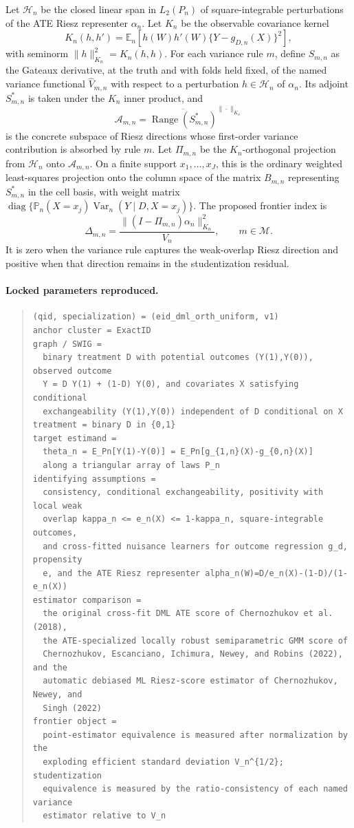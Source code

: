 \documentclass[11pt]{article}
\newcommand{\E}{\mathbb{E}}
\renewcommand{\Pr}{\mathbb{P}}
\newcommand{\calH}{\mathcal{H}}
\theoremstyle{definition}
\theoremstyle{plain}
\theoremstyle{remark}
\begin{document}
Let \(\calH_n\) be the closed linear span in \(L_2(P_n)\) of square-integrable perturbations of the ATE Riesz representer \(\alpha_n\).  Let \(K_n\) be the observable covariance kernel
\[
  K_n(h,h')=
  \E_n\!\left[h(W)h'(W)\{Y-g_{D,n}(X)\}^2\right],
\]
with seminorm \(\|h\|_{K_n}^2=K_n(h,h)\).  For each variance rule \(m\), define \(S_{m,n}\) as the Gateaux derivative, at the truth and with folds held fixed, of the named variance functional \(\hat V_{m,n}\) with respect to a perturbation \(h\in\calH_n\) of \(\alpha_n\).  Its adjoint \(S_{m,n}^*\) is taken under the \(K_n\) inner product, and
\[
  \mathcal{A}_{m,n}=\overline{\operatorname{Range}(S_{m,n}^*)}^{\|\cdot\|_{K_n}}
\]
is the concrete subspace of Riesz directions whose first-order variance contribution is absorbed by rule \(m\).  Let \(\Pi_{m,n}\) be the \(K_n\)-orthogonal projection from \(\calH_n\) onto \(\mathcal{A}_{m,n}\).  On a finite support \(x_1,\ldots,x_J\), this is the ordinary weighted least-squares projection onto the column space of the matrix \(B_{m,n}\) representing \(S_{m,n}^*\) in the cell basis, with weight matrix \(\operatorname{diag}\{\Pr_n(X=x_j)\operatorname{Var}_n(Y\mid D,X=x_j)\}\).  The proposed frontier index is
\[
  \Delta_{m,n}
  =
  \frac{\|(I-\Pi_{m,n})\alpha_n\|_{K_n}^2}{V_n},
  \qquad m\in\mathcal M.
\]
It is zero when the variance rule captures the weak-overlap Riesz direction and positive when that direction remains in the studentization residual.

\paragraph{Locked parameters reproduced.}
\begin{quote}\small
\begin{verbatim}
(qid, specialization) = (eid_dml_orth_uniform, v1)
anchor cluster = ExactID
graph / SWIG =
  binary treatment D with potential outcomes (Y(1),Y(0)), observed outcome
  Y = D Y(1) + (1-D) Y(0), and covariates X satisfying conditional
  exchangeability (Y(1),Y(0)) independent of D conditional on X
treatment = binary D in {0,1}
target estimand =
  theta_n = E_Pn[Y(1)-Y(0)] = E_Pn[g_{1,n}(X)-g_{0,n}(X)]
  along a triangular array of laws P_n
identifying assumptions =
  consistency, conditional exchangeability, positivity with local weak
  overlap kappa_n <= e_n(X) <= 1-kappa_n, square-integrable outcomes,
  and cross-fitted nuisance learners for outcome regression g_d, propensity
  e, and the ATE Riesz representer alpha_n(W)=D/e_n(X)-(1-D)/(1-e_n(X))
estimator comparison =
  the original cross-fit DML ATE score of Chernozhukov et al. (2018),
  the ATE-specialized locally robust semiparametric GMM score of
  Chernozhukov, Escanciano, Ichimura, Newey, and Robins (2022), and the
  automatic debiased ML Riesz-score estimator of Chernozhukov, Newey, and
  Singh (2022)
frontier object =
  point-estimator equivalence is measured after normalization by the
  exploding efficient standard deviation V_n^{1/2}; studentization
  equivalence is measured by the ratio-consistency of each named variance
  estimator relative to V_n
\end{verbatim}
\end{quote}
\end{document}
